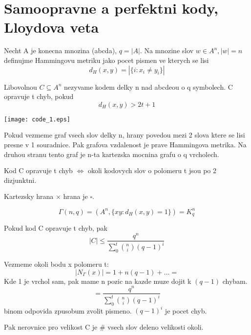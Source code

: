 \section{\texorpdfstring{Samoopravne a perfektni kody, Lloydova veta}{Samoopravne a perfektni kody, Lloydova veta}}

\vspace{5mm}
\large

\begin{definition}
	Necht A je konecna mnozina (abcda), $q = |A|$. Na mnozine slov $w \in A^n, |w| = n$ definujme Hammingovu metriku jako pocet pismen ve kterych se lisi
	\[ d_H(x, y) = |\{i : x_i \neq y_i \}| \]

	Libovolnou $C \subseteq A^n$ nezyvame kodem delky n nad abcdeou o q symbolech. C opravuje t chyb, pokud
	\[ d_H(x, y) > 2t + 1 \]

	\texttt{[image: code\_1.eps]}
\end{definition}

\begin{observation}
	Pokud vezmeme graf vsech slov delky n, hrany povedou mezi 2 slova ktere se lisi presne v 1 souradnice. Pak grafova vzdalenost je prave Hammingova metrika. Na druhou stranu tento graf je n-ta kartezska mocnina grafu o q vrcholech.

	Kod C opravuje t chyb $\iff$ okoli kodovych slov o polomeru t jsou po 2 dizjunktni.
\end{observation}

\begin{observation}
	Kartezsky hrana $\times$ hrana je $\square$.
\end{observation}

\begin{definition}
	\[ \Gamma(n,q) = (A^n, \{xy: d_H(x, y) = 1 \}) = K_q^n \]
\end{definition}

\begin{note}
	Pokud kod C opravuje t chyb, pak
	\[ |C| \leq \frac{q^n}{\sum_0^t \binom{n}{i} (q - 1)^i} \]

	Vezmeme okoli bodu x polomeru t:
	\[ |N_{\Gamma}(x)| = 1 + n(q - 1) + ... = \]
	Kde 1 je vrchol sam, pak mame n pozic na kazde muze dojit k $(q - 1)$ chybam.
	\[ = \frac{q^n}{\sum_0^t \binom{n}{i} (q - 1)^i} \]
	binom odpovida zpusobum zvolit pismeno. $(q - 1)^i$ je pocet chyb.

	Pak nerovnice pro velikost C je \# vsech slov deleno velikosti okoli.

\end{note}


